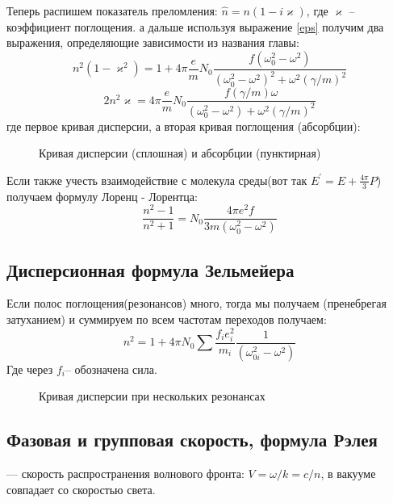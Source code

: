 Теперь распишем показатель преломления: $\hat{n} = n(1-i\varkappa)$, где $\varkappa$ -- коэффициент поглощения. а дальше используя выражение \eqref{eps} получим два выражения, определяющие зависимости из названия главы: 
\begin{equation}
n^{2}\left(1-\varkappa^{2}\right)=1+4 \pi \frac{e}{m} N_{0} \frac{f\left(\omega_{0}^{2}-\omega^{2}\right)}{\left(\omega_{0}^{2}-\omega^{2}\right)^{2}+\omega^{2}(\gamma / m)^{2}}
\end{equation}
\begin{equation}
2 n^{2} \varkappa=4 \pi \frac{e}{m} N_{0} \frac{f(\gamma / m) \omega}{\left(\omega_{0}^{2}-\omega^{2}\right)+\omega^{2}(\gamma / m)^{2}}
\end{equation}
где первое кривая дисперсии, а вторая кривая поглощения (абсорбции): 
\begin{figure}[h]\label{qr}
	\caption{ Кривая дисперсии (сплошная) и абсорбции (пунктирная)}
	\label{fig:image}
\end{figure}


Если также учесть взаимодействие с молекула среды(вот так $E^{\prime}=E+\frac{4 \pi}{3} P$) получаем формулу Лоренц - Лорентца:
\begin{equation}
\frac{n^{2}-1}{n^{2}+1}=N_{0} \frac{4 \pi e^{2} f}{3 m\left(\omega_{0}^{2}-\omega^{2}\right)}
\end{equation}

\subsection{Дисперсионная формула Зельмейера}

Если полос поглощения(резонансов) много, тогда мы получаем (пренебрегая затуханием) и суммируем по всем частотам переходов получаем:
\begin{equation}
n^{2}=1+4 \pi N_{0} \sum \frac{f_{i} e_{i}^{2}}{m_{i}} \frac{1}{\left(\omega_{0 i}^{2}-\omega^{2}\right)}
\end{equation}
Где через $f_i$-- обозначена сила.
\begin{figure}[h]\label{qr}
	\caption{ Кривая дисперсии при нескольких резонансах}
	\label{fig:image}
\end{figure}
\subsection{Фазовая и групповая скорость, формула Рэлея}
 --- скорость распространения волнового фронта: $V = \omega/k=c/n$, в вакууме совпадает со скоростью света.

